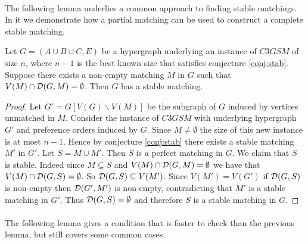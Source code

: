 \paragraph{}
The following lemma underlies a common approach to finding stable matchings. In it we demonstrate how a partial matching can be used to construct a complete stable matching.
\begin{lemma}\label{lemma:inductive}
Let $G=(A\cup B \cup C, E)$ be a hypergraph underlying an instance of $C3GSM$ of size $n$, where $n-1$ is the best known size that satisfies conjecture \ref{conj:stab}. Suppose there exists a non-empty matching $M$ in $G$ such that $V(M) \cap \mathcal{D}(G,M) = \emptyset$. Then $G$ has a stable matching.
\end{lemma}
\begin{proof}
Let $G' = G[V(G)\backslash V(M)]$ be the subgraph of $G$ induced by vertices unmatched in $M$.  Consider the instance of $C3GSM$ with underlying hypergraph $G'$ and preference orders induced by $G$. Since $M \neq \emptyset$ the size of this new instance is at most $n-1$. Hence by conjecture \ref{conj:stab} there exists a stable matching $M'$ in $G'$. Let $S = M \cup M'$. Then $S$ is a perfect matching in $G$. We claim that $S$ is stable. Indeed since $M \subseteq S$ and $V(M) \cap \mathcal{D}(G,M) = \emptyset$ we have that $V(M) \cap \mathcal{D}(G,S) = \emptyset$. So $\mathcal{D}(G,S) \subseteq V(M')$. Since $V(M') = V(G')$ if $\mathcal{D}(G,S)$ is non-empty then $\mathcal{D}(G', M')$ is non-empty, contradicting that $M'$ is a stable matching in $G'$. Thus $\mathcal{D}(G,S) = \emptyset$ and therefore $S$ is a stable matching in $G$.
\end{proof}

\paragraph{}
The following lemma gives a condition that is faster to check than the previous lemma, but still covers some common cases.

